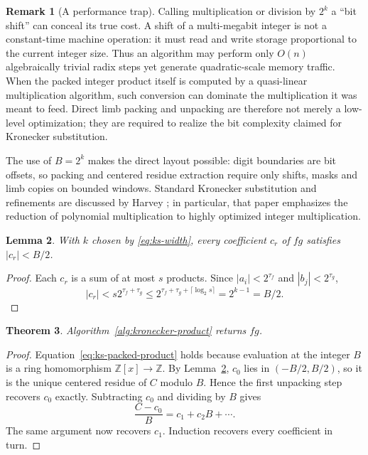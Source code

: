 \documentclass[11pt]{book}
\newtheorem{theorem}{Theorem}[section]
\newtheorem{lemma}[theorem]{Lemma}
\theoremstyle{definition}
\newtheorem{remark}[theorem]{Remark}
\newcommand{\ZZ}{\mathbb Z}
\begin{document}
\begin{remark}[A performance trap]\label{rem:ks-packing-performance}
Calling multiplication or division by $2^k$ a ``bit shift'' can conceal its
true cost.  A shift of a multi-megabit integer is not a constant-time machine
operation: it must read and write storage proportional to the current integer
size.  Thus an algorithm may perform only $O(n)$ algebraically trivial radix
steps yet generate quadratic-scale memory traffic.  When the packed integer
product itself is computed by a quasi-linear multiplication algorithm, such
conversion can dominate the multiplication it was meant to feed.  Direct limb
packing and unpacking are therefore not merely a low-level optimization; they
are required to realize the bit complexity claimed for Kronecker substitution.
\end{remark}

The use of $B=2^k$ makes the direct layout possible: digit boundaries are bit
offsets, so packing and centered residue extraction require only shifts,
masks and limb copies on bounded windows.  Standard Kronecker substitution and
refinements are discussed by Harvey \cite{Harvey2009}; in particular, that
paper emphasizes the reduction of polynomial multiplication to highly
optimized integer multiplication.

\begin{lemma}\label{lem:ks-bound}
With $k$ chosen by \eqref{eq:ks-width}, every coefficient $c_r$ of $fg$
satisfies $|c_r|<B/2$.
\end{lemma}

\begin{proof}
Each $c_r$ is a sum of at most $s$ products.  Since
$|a_i|<2^{\tau_f}$ and $|b_j|<2^{\tau_g}$,
\[
 |c_r|<s2^{\tau_f+\tau_g}
 \leq 2^{\tau_f+\tau_g+\lceil\log_2s\rceil}
 =2^{k-1}=B/2.
\]
\end{proof}

\begin{theorem}\label{thm:ks-correctness}
Algorithm~\ref{alg:kronecker-product} returns $fg$.
\end{theorem}

\begin{proof}
Equation~\eqref{eq:ks-packed-product} holds because evaluation at the integer
$B$ is a ring homomorphism $\ZZ[x]\to\ZZ$.  By
Lemma~\ref{lem:ks-bound}, $c_0$ lies in $(-B/2,B/2)$, so it is the unique
centered residue of $C$ modulo $B$.  Hence the first unpacking step recovers
$c_0$ exactly.  Subtracting $c_0$ and dividing by $B$ gives
\[
 \frac{C-c_0}{B}=c_1+c_2B+\cdots.
\]
The same argument now recovers $c_1$.  Induction recovers every coefficient in
turn.
\end{proof}
\end{document}
